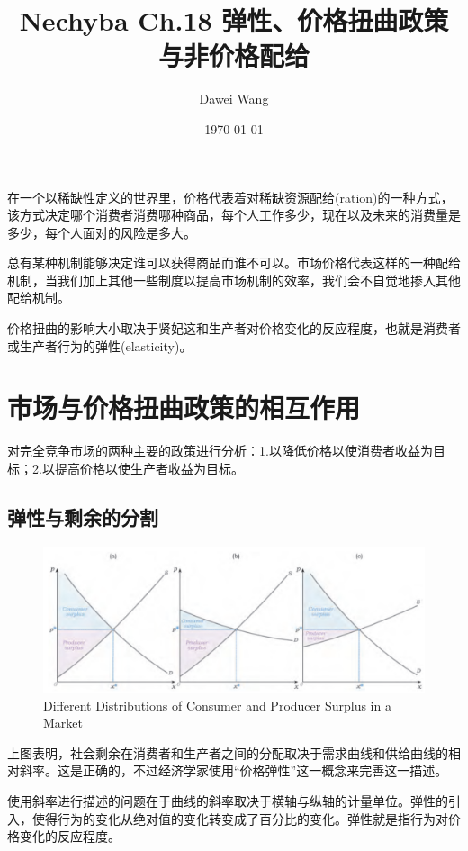 \documentclass{article}
\title{Nechyba Ch.18 弹性、价格扭曲政策与非价格配给}
\author{Dawei Wang}
\date{\today}
\begin{document}
	\maketitle
	在一个以稀缺性定义的世界里，价格代表着对稀缺资源配给(ration)的一种方式，该方式决定哪个消费者消费哪种商品，每个人工作多少，现在以及未来的消费量是多少，每个人面对的风险是多大。
	
	总有某种机制能够决定谁可以获得商品而谁不可以。市场价格代表这样的一种配给机制，当我们加上其他一些制度以提高市场机制的效率，我们会不自觉地掺入其他配给机制。
	
	价格扭曲的影响大小取决于贤妃这和生产者对价格变化的反应程度，也就是消费者或生产者行为的弹性(elasticity)。
	
\section{市场与价格扭曲政策的相互作用}

对完全竞争市场的两种主要的政策进行分析：1.以降低价格以使消费者收益为目标；2.以提高价格以使生产者收益为目标。

\subsection{弹性与剩余的分割}

\begin{figure}[H] %
	\centering %
	\includegraphics[width=1\textwidth]{18_1} %
	\caption{Different Distributions of Consumer and Producer Surplus in a Market} %
	\label{Fig.main2} %
\end{figure}

上图表明，社会剩余在消费者和生产者之间的分配取决于需求曲线和供给曲线的相对斜率。这是正确的，不过经济学家使用“价格弹性”这一概念来完善这一描述。

使用斜率进行描述的问题在于曲线的斜率取决于横轴与纵轴的计量单位。弹性的引入，使得行为的变化从绝对值的变化转变成了百分比的变化。弹性就是指行为对价格变化的反应程度。
\end{document}
